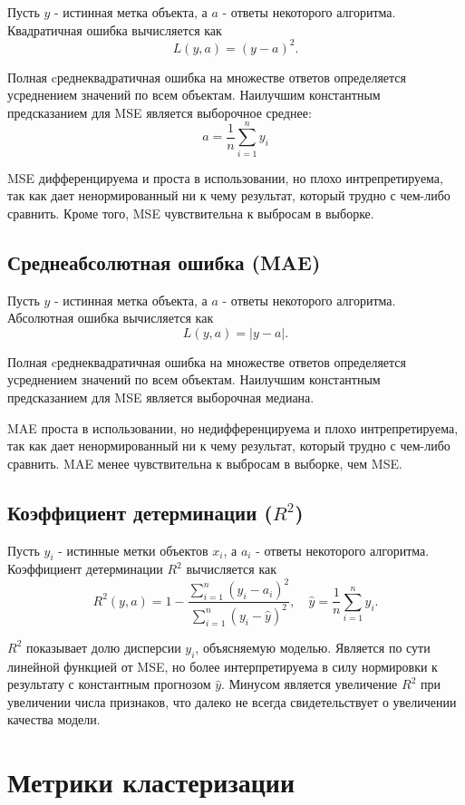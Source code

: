 Пусть $y$ - истинная метка объекта, а $a$ - ответы некоторого алгоритма. Квадратичная ошибка вычисляется как
$$
L(y, a) = (y - a)^2.
$$

Полная cреднеквадратичная ошибка на множестве ответов определяется усреднением значений по всем объектам.
Наилучшим константным предсказанием для MSE является выборочное среднее:
$$
a = \frac{1}{n}\sum_{i=1}^ny_i
$$

MSE дифференцируема и проста в использовании, но плохо интрепретируема, так как дает ненормированный ни к чему результат, который трудно с чем-либо сравнить. Кроме того, MSE чувствительна к выбросам в выборке.

\subsection{Среднеабсолютная ошибка (MAE)}

Пусть $y$ - истинная метка объекта, а $a$ - ответы некоторого алгоритма. Абсолютная ошибка вычисляется как
$$
L(y, a) = |y - a|.
$$

Полная cреднеквадратичная ошибка на множестве ответов определяется усреднением значений по всем объектам.
Наилучшим константным предсказанием для MSE является выборочная медиана.

MAE проста в использовании, но недифференцируема и плохо интрепретируема, так как дает ненормированный ни к чему результат, который трудно с чем-либо сравнить. MAE менее чувствительна к выбросам в выборке, чем MSE.


\subsection{Коэффициент детерминации ($R^2$)}

Пусть $y_i$ - истинные метки объектов $x_i$, а $a_i$ - ответы некоторого алгоритма. Коэффициент детерминации $R^2$ вычисляется как
$$
R^2(y, a) = 1 - \frac{\sum_{i=1}^n(y_i - a_i)^2}{\sum_{i=1}^n(y_i - \hat{y})^2}, \quad \hat{y} = \frac{1}{n}\sum_{i=1}^ny_i.
$$

$R^2$ показывает долю дисперсии $y_i$, объясняемую моделью. Является по сути линейной функцией от MSE, но более интерпретируема в силу нормировки к результату с константным прогнозом $\hat{y}$. Минусом является увеличение $R^2$ при увеличении числа признаков, что далеко не всегда свидетельствует о увеличении качества модели.


\section{Метрики кластеризации}


